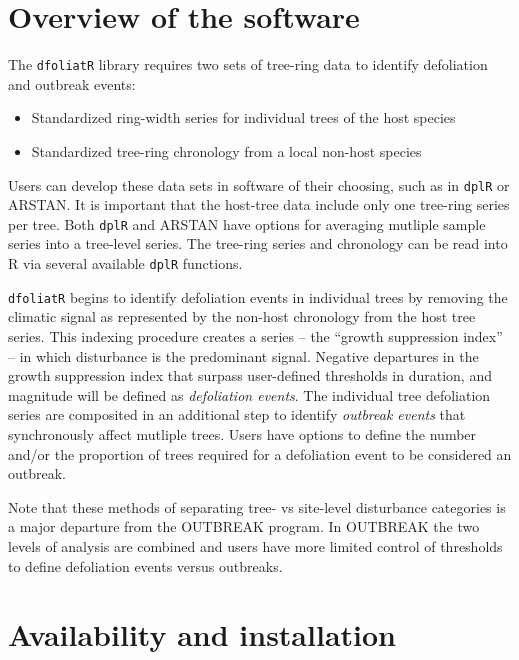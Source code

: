 \documentclass[review]{elsarticle} %
\providecommand{\tightlist}{%
  \setlength{\itemsep}{0pt}\setlength{\parskip}{0pt}}
\begin{document}
\hypertarget{overview-of-the-software}{%
\section{Overview of the software}\label{overview-of-the-software}}

The \texttt{dfoliatR} library requires two sets of tree-ring data to
identify defoliation and outbreak events:

\begin{itemize}
\tightlist
\item
  Standardized ring-width series for individual trees of the host
  species
\item
  Standardized tree-ring chronology from a local non-host species
\end{itemize}

Users can develop these data sets in software of their choosing, such as
in \texttt{dplR} or ARSTAN. It is important that the host-tree data
include only one tree-ring series per tree. Both \texttt{dplR} and
ARSTAN have options for averaging mutliple sample series into a
tree-level series. The tree-ring series and chronology can be read into
R via several available \texttt{dplR} functions.

\texttt{dfoliatR} begins to identify defoliation events in individual
trees by removing the climatic signal as represented by the non-host
chronology from the host tree series. This indexing procedure creates a
series -- the ``growth suppression index'' -- in which disturbance is
the predominant signal. Negative departures in the growth suppression
index that surpass user-defined thresholds in duration, and magnitude
will be defined as \emph{defoliation events}. The individual tree
defoliation series are composited in an additional step to identify
\emph{outbreak events} that synchronously affect mutliple trees. Users
have options to define the number and/or the proportion of trees
required for a defoliation event to be considered an outbreak.

Note that these methods of separating tree- vs site-level disturbance
categories is a major departure from the OUTBREAK program. In OUTBREAK
the two levels of analysis are combined and users have more limited
control of thresholds to define defoliation events versus outbreaks.

\hypertarget{availability-and-installation}{%
\section{Availability and
installation}\label{availability-and-installation}}
\end{document}
